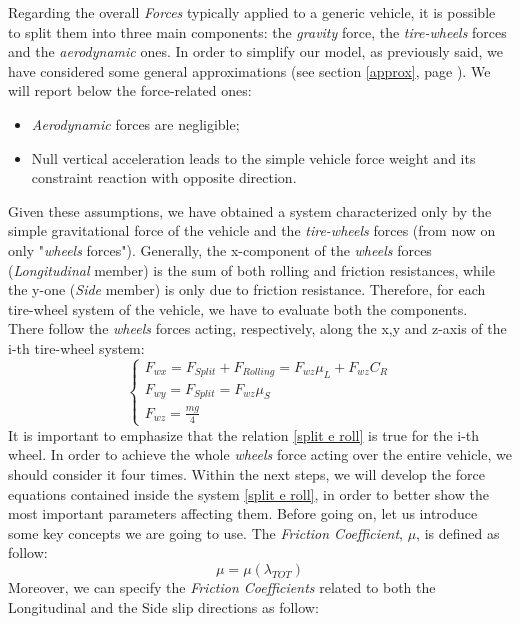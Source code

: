 Regarding the overall \textit{Forces} typically applied to a generic vehicle, it is possible to split them into three main components: the \textit{gravity} force, the \textit{tire-wheels} forces and the \textit{aerodynamic} ones. In order to simplify our model, as previously said, we have considered some general approximations (see section \ref{approx}, page \pageref{approx}). We will report below the force-related ones:
\begin{itemize}
	\item \textit{Aerodynamic} forces are negligible;
	\item Null vertical acceleration leads to the simple vehicle force weight and its constraint reaction with opposite direction.
\end{itemize}
Given these assumptions, we have obtained a system characterized only by the simple gravitational force of the vehicle and the \textit{tire-wheels} forces (from now on only "\textit{wheels} forces"). Generally, the x-component of the \textit{wheels} forces (\textit{Longitudinal} member) is the sum of both rolling and friction resistances, while the y-one (\textit{Side} member) is only due to friction resistance.
Therefore, for each tire-wheel system of the vehicle, we have to evaluate both the components. \\
There follow the \textit{wheels} forces acting, respectively, along the x,y and z-axis of the i-th tire-wheel system:
\begin{equation} \label{split e roll}
\begin{cases}
F_{wx} = F_{Split} + F_{Rolling} = F_{wz} \mu_{L} + F_{wz} C_{R} \\
F_{wy} = F_{Split} = F_{wz} \mu_{S} \\
F_{wz} = \frac{mg}{4}
\end{cases}
\end{equation}
It is important to emphasize that the relation \ref{split e roll} is true for the i-th wheel. In order to achieve the whole \textit{wheels} force acting over the entire vehicle, we should consider it four times. Within the next steps, we will develop the force equations contained inside the system \ref{split e roll}, in order to better show the most important parameters affecting them.
\newpage
Before going on, let us introduce some key concepts we are going to use. The \textit{Friction Coefficient}, $ \mu $, is defined as follow:
\begin{equation}
\mu = \mu(\lambda_{TOT})
\end{equation}
Moreover, we can specify the \textit{Friction Coefficients} related to both the Longitudinal and the Side slip directions as follow:
